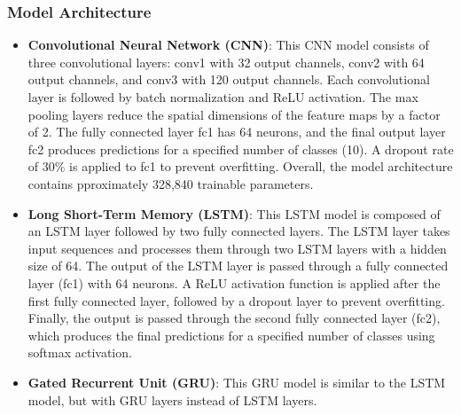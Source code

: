 \documentclass{article}
\begin{document}
\subsubsection{Model Architecture}
\begin{itemize}
    \item \textbf{Convolutional Neural Network (CNN)}: 
    This CNN model consists of three convolutional layers: conv1 with 32 output channels, conv2 with 64 output channels, and conv3 with 120 output channels. 
    Each convolutional layer is followed by batch normalization and ReLU activation. The max pooling layers reduce the spatial dimensions of the feature maps by a factor of 2.
    The fully connected layer fc1 has 64 neurons, and the final output layer fc2 produces predictions for a specified number of classes (10). A dropout rate of 30\% is applied to fc1 to prevent overfitting. 
    Overall, the model architecture contains pproximately 328,840 trainable parameters.
    \item \textbf{Long Short-Term Memory (LSTM)}: 
    This LSTM model is composed of an LSTM layer followed by two fully connected layers. The LSTM layer takes input sequences and processes them through two LSTM layers with a hidden size of 64. 
    The output of the LSTM layer is passed through a fully connected layer (fc1) with 64 neurons. A ReLU activation function is applied after the first fully connected layer, followed by a dropout layer to prevent overfitting. 
    Finally, the output is passed through the second fully connected layer (fc2), which produces the final predictions for a specified number of classes using softmax activation.
    \item \textbf{Gated Recurrent Unit (GRU)}: 
    This GRU model is similar to the LSTM model, but with GRU layers instead of LSTM layers.
\end{itemize}
\end{document}
